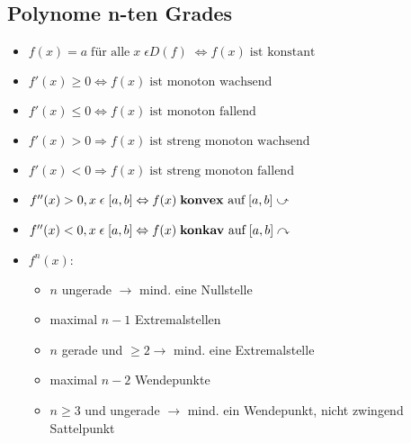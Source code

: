 \subsection{Polynome n-ten Grades}
    \begin{itemize}
        \item $f(x) = a \; \text{für alle} \; x \; \epsilon D(f) \; \Leftrightarrow f(x) \; \text{ist konstant}$
        \item $f'(x) \geq 0 \Leftrightarrow f(x) \; \text{ist monoton wachsend}$
        \item $f'(x) \leq 0 \Leftrightarrow f(x) \; \text{ist monoton fallend}$
        \item $f'(x) > 0 \Rightarrow f(x) \; \text{ist streng monoton wachsend}$
        \item $f'(x) < 0 \Rightarrow f(x) \; \text{ist streng monoton fallend}$
        \item $f''(x) > 0, x \; \epsilon \; [a,b] \Leftrightarrow f(x) \; \text{\textbf{konvex} auf} \; [a,b] \; \rotatebox[origin=c]{180}{$\curvearrowleft$}$
        \item $f''(x) < 0, x \; \epsilon \; [a,b] \Leftrightarrow f(x) \; \text{\textbf{konkav} auf} \; [a,b] \curvearrowright$
        \item $f^n(x):$
            \vspace*{-0.5em}
            \begin{itemize}
                \item $n$ ungerade $\rightarrow$ mind. eine Nullstelle
                \item maximal $n-1$ Extremalstellen
                \item $n$ gerade und $\geq 2 \rightarrow $ mind. eine Extremalstelle
                \item maximal $n-2$ Wendepunkte
                \item $n \geq 3$ und ungerade $\rightarrow$ mind. ein Wendepunkt, nicht zwingend Sattelpunkt
            \end{itemize}
    \end{itemize}